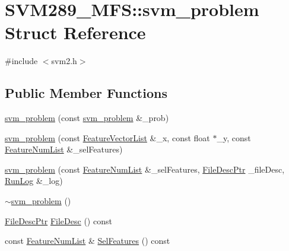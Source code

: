 \hypertarget{struct_s_v_m289___m_f_s_1_1svm__problem}{}\section{S\+V\+M289\+\_\+\+M\+FS\+:\+:svm\+\_\+problem Struct Reference}
\label{struct_s_v_m289___m_f_s_1_1svm__problem}


{\ttfamily \#include $<$svm2.\+h$>$}

\subsection*{Public Member Functions}
\begin{DoxyCompactItemize}
\item 
\hyperlink{struct_s_v_m289___m_f_s_1_1svm__problem_a21c604f18b9dfc97f712016ff9da2ddc}{svm\+\_\+problem} (const \hyperlink{struct_s_v_m289___m_f_s_1_1svm__problem}{svm\+\_\+problem} \&\+\_\+prob)
\item 
\hyperlink{struct_s_v_m289___m_f_s_1_1svm__problem_ad06f4ca3975313f8187de3e70e5d3dd1}{svm\+\_\+problem} (const \hyperlink{class_k_k_m_l_l_1_1_feature_vector_list}{Feature\+Vector\+List} \&\+\_\+x, const float $\ast$\+\_\+y, const \hyperlink{class_k_k_m_l_l_1_1_feature_num_list}{Feature\+Num\+List} \&\+\_\+sel\+Features)
\item 
\hyperlink{struct_s_v_m289___m_f_s_1_1svm__problem_a27db6cb26252000f67cc603ac573878c}{svm\+\_\+problem} (const \hyperlink{class_k_k_m_l_l_1_1_feature_num_list}{Feature\+Num\+List} \&\+\_\+sel\+Features, \hyperlink{namespace_k_k_m_l_l_aa0d0b6ab4ec18868a399b8455b05d914}{File\+Desc\+Ptr} \+\_\+file\+Desc, \hyperlink{class_k_k_b_1_1_run_log}{Run\+Log} \&\+\_\+log)
\item 
\hyperlink{struct_s_v_m289___m_f_s_1_1svm__problem_ab047f6e0057ea6d956009d3bc38c7c46}{$\sim$svm\+\_\+problem} ()
\item 
\hyperlink{namespace_k_k_m_l_l_aa0d0b6ab4ec18868a399b8455b05d914}{File\+Desc\+Ptr} \hyperlink{struct_s_v_m289___m_f_s_1_1svm__problem_a4b0a7bee7be16b685372bc6d2cfcda8d}{File\+Desc} () const 
\item 
const \hyperlink{class_k_k_m_l_l_1_1_feature_num_list}{Feature\+Num\+List} \& \hyperlink{struct_s_v_m289___m_f_s_1_1svm__problem_abf41e96f4e6b9af73afab424460b53da}{Sel\+Features} () const 
\end{DoxyCompactItemize}
